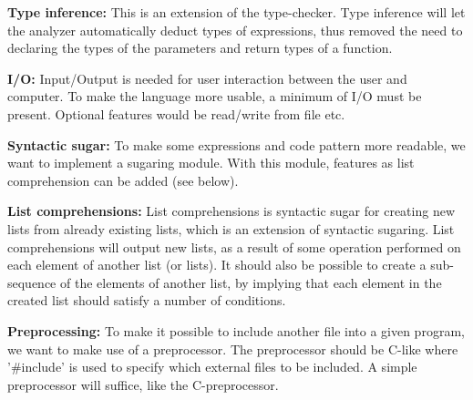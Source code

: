 \textbf{Type inference:}
This is an extension of the type-checker. Type inference will let the analyzer automatically deduct types of expressions, thus removed the need to declaring the types of the parameters and return types of a function.

\textbf{I/O:}
Input/Output is needed for user interaction between the user and computer. To make the language more usable, a minimum of I/O must be present. Optional features would be read/write from file etc.

\textbf{Syntactic sugar:}
To make some expressions and code pattern more readable, we want to implement a sugaring module. With this module, features as list comprehension can be added (see below).

\textbf{List comprehensions:}
List comprehensions is syntactic sugar for creating new lists from already existing lists, which is an extension of syntactic sugaring. List comprehensions will output new lists, as a result of some operation performed on each element of another list (or lists). It should also be possible to create a sub-sequence of the elements of another list, by implying that each element in the created list should satisfy a number of conditions.

\textbf{Preprocessing:}
To make it possible to include another file into a given program, we want to make use of a preprocessor. The preprocessor should be C-like where '\#include' is used to specify which external files to be included. A simple preprocessor will suffice, like the C-preprocessor.




